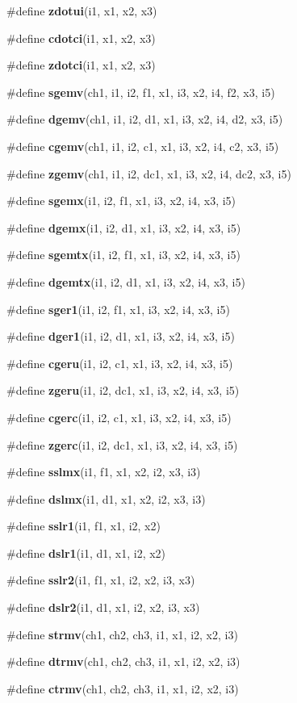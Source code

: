 \begin{CompactItemize}
\item 
\#define {\bf zdotui}(i1, x1, x2, x3)
\item 
\#define {\bf cdotci}(i1, x1, x2, x3)
\item 
\#define {\bf zdotci}(i1, x1, x2, x3)
\item 
\#define {\bf sgemv}(ch1, i1, i2, f1, x1, i3, x2, i4, f2, x3, i5)
\item 
\#define {\bf dgemv}(ch1, i1, i2, d1, x1, i3, x2, i4, d2, x3, i5)
\item 
\#define {\bf cgemv}(ch1, i1, i2, c1, x1, i3, x2, i4, c2, x3, i5)
\item 
\#define {\bf zgemv}(ch1, i1, i2, dc1, x1, i3, x2, i4, dc2, x3, i5)
\item 
\#define {\bf sgemx}(i1, i2, f1, x1, i3, x2, i4, x3, i5)
\item 
\#define {\bf dgemx}(i1, i2, d1, x1, i3, x2, i4, x3, i5)
\item 
\#define {\bf sgemtx}(i1, i2, f1, x1, i3, x2, i4, x3, i5)
\item 
\#define {\bf dgemtx}(i1, i2, d1, x1, i3, x2, i4, x3, i5)
\item 
\#define {\bf sger1}(i1, i2, f1, x1, i3, x2, i4, x3, i5)
\item 
\#define {\bf dger1}(i1, i2, d1, x1, i3, x2, i4, x3, i5)
\item 
\#define {\bf cgeru}(i1, i2, c1, x1, i3, x2, i4, x3, i5)
\item 
\#define {\bf zgeru}(i1, i2, dc1, x1, i3, x2, i4, x3, i5)
\item 
\#define {\bf cgerc}(i1, i2, c1, x1, i3, x2, i4, x3, i5)
\item 
\#define {\bf zgerc}(i1, i2, dc1, x1, i3, x2, i4, x3, i5)
\item 
\#define {\bf sslmx}(i1, f1, x1, x2, i2, x3, i3)
\item 
\#define {\bf dslmx}(i1, d1, x1, x2, i2, x3, i3)
\item 
\#define {\bf sslr1}(i1, f1, x1, i2, x2)
\item 
\#define {\bf dslr1}(i1, d1, x1, i2, x2)
\item 
\#define {\bf sslr2}(i1, f1, x1, i2, x2, i3, x3)
\item 
\#define {\bf dslr2}(i1, d1, x1, i2, x2, i3, x3)
\item 
\#define {\bf strmv}(ch1, ch2, ch3, i1, x1, i2, x2, i3)
\item 
\#define {\bf dtrmv}(ch1, ch2, ch3, i1, x1, i2, x2, i3)
\item 
\#define {\bf ctrmv}(ch1, ch2, ch3, i1, x1, i2, x2, i3)

\end{CompactItemize}
